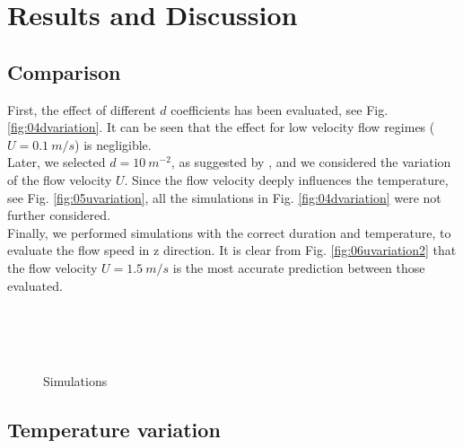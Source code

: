 
\section{Results and Discussion}
\label{section:resultsdiscussion}



\subsection{Comparison}
\label{subsection:comparison}

First, the effect of different $d$ coefficients has been evaluated, see Fig.
\ref{fig:04dvariation}.
It can be seen that the effect for low velocity flow regimes ($U = 0.1 ~m/s$) is
negligible.\\
Later, we selected $d = 10 ~m^{-2}$, as suggested by
\textcite{Permeability}, and we considered the variation of the flow velocity
$U$.
Since the flow velocity deeply influences the temperature, see Fig.
\ref{fig:05uvariation}, all the simulations in Fig. \ref{fig:04dvariation} were
not further considered.\\
Finally, we performed simulations with the correct duration and temperature, to
evaluate the flow speed in z direction.
It is clear from Fig. \ref{fig:06uvariation2} that the flow velocity $U = 1.5
~m/s$ is the most accurate prediction between those evaluated.

\begin{figure}[!h]
\centering
{} \\ 
 \\  
 \\  
\caption[Simulations]{Simulations}
\label{fig:simulations}
\end{figure}

\subsection{Temperature variation}
\label{subsection:temperaturevariation}

